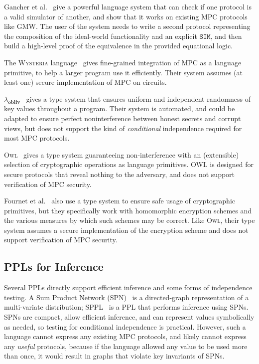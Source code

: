 \documentclass[compsoc, conference, a4paper, 10pt, times]{IEEEtran}
\begin{document}
Gancher et al.~\cite{gancher2023core} %
give a powerful language system that can check if one protocol is a valid simulator of another,
and show that it works on existing MPC protocols like GMW.
The user of the system needs to write a second protocol
representing the composition of the ideal-world functionality and an explicit $\mathtt{SIM}$,
and then build a high-level proof of the equivalence in the provided equational logic.

The \textsc{Wysteria} language~\cite{rastogi2014wysteria} %
gives fine-grained integration of MPC as a language primitive, to help a larger program use it efficiently.
Their system assumes (at least one) secure implementation of MPC on circuits.

$\lambda_\textbf{obliv}$~\cite{darais2019language} %
gives a type system that ensures uniform and independent randomness of key values throughout a program.
Their system is automated, and could be adapted to ensure perfect noninterference between honest secrets and corrupt views,
but does not support the kind of \emph{conditional} independence required for most MPC protocols.

\textsc{Owl}~\cite{gancher2023owl} %
gives a type system guaranteeing non-interference with an (extensible) selection of cryptographic operations as language primitives.
OWL is designed for secure protocols that reveal nothing to the adversary, and does not support verification of MPC security.

Fournet et al.~\cite{fournet2011information} %
also use a type system to ensure safe usage of cryptographic primitives,
but they specifically work with homomorphic encryption schemes and the various measures by which such schemes may be correct.
Like \textsc{Owl}, their type system assumes a secure implementation of the encryption scheme and does not support verification of MPC security.

\subsection{PPLs for Inference}

Several PPLs directly support efficient inference and some forms of independence testing.
A Sum Product Network (SPN)~\cite{poon2011sum} is a directed-graph representation of a multi-variate distribution;
SPPL~\cite{saad2021sppl} is a PPL that performs inference using SPNs.
SPNs are compact, allow efficient inference, and can represent values symbolically as needed,
so testing for conditional independence is practical.
However, such a language cannot express any existing MPC protocols, and likely cannot express any \textit{useful} protocols,
because if the language allowed any value to be used more than once, it would result in graphs that violate key invariants of SPNs.
\end{document}
